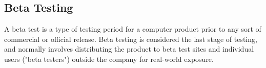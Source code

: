 \subsection{Beta Testing}
A beta test is a type of testing period for a computer product prior to any sort of commercial or official release. Beta testing is considered the last stage of testing, and normally involves distributing the product to beta test sites and individual users ("beta testers") outside the company for real-world exposure.